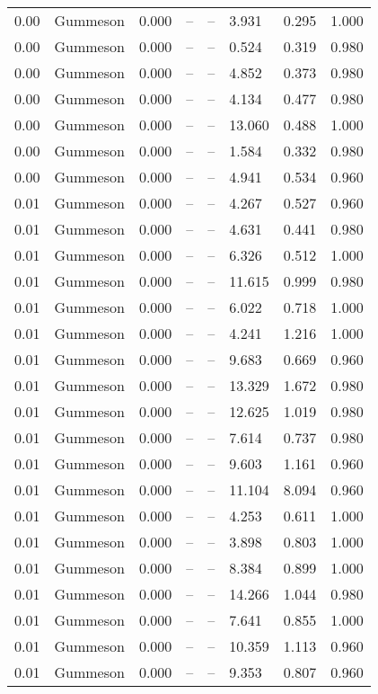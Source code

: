 \begin{table}[H]
\begin{tabular}{l c l l l}
0.00 & Gummeson & 0.000 & -- & -- & 3.931 & 0.295 & 1.000 \\
0.00 & Gummeson & 0.000 & -- & -- & 0.524 & 0.319 & 0.980 \\
0.00 & Gummeson & 0.000 & -- & -- & 4.852 & 0.373 & 0.980 \\
0.00 & Gummeson & 0.000 & -- & -- & 4.134 & 0.477 & 0.980 \\
0.00 & Gummeson & 0.000 & -- & -- & 13.060 & 0.488 & 1.000 \\
0.00 & Gummeson & 0.000 & -- & -- & 1.584 & 0.332 & 0.980 \\
0.00 & Gummeson & 0.000 & -- & -- & 4.941 & 0.534 & 0.960 \\
0.01 & Gummeson & 0.000 & -- & -- & 4.267 & 0.527 & 0.960 \\
0.01 & Gummeson & 0.000 & -- & -- & 4.631 & 0.441 & 0.980 \\
0.01 & Gummeson & 0.000 & -- & -- & 6.326 & 0.512 & 1.000 \\
0.01 & Gummeson & 0.000 & -- & -- & 11.615 & 0.999 & 0.980 \\
0.01 & Gummeson & 0.000 & -- & -- & 6.022 & 0.718 & 1.000 \\
0.01 & Gummeson & 0.000 & -- & -- & 4.241 & 1.216 & 1.000 \\
0.01 & Gummeson & 0.000 & -- & -- & 9.683 & 0.669 & 0.960 \\
0.01 & Gummeson & 0.000 & -- & -- & 13.329 & 1.672 & 0.980 \\
0.01 & Gummeson & 0.000 & -- & -- & 12.625 & 1.019 & 0.980 \\
0.01 & Gummeson & 0.000 & -- & -- & 7.614 & 0.737 & 0.980 \\
0.01 & Gummeson & 0.000 & -- & -- & 9.603 & 1.161 & 0.960 \\
0.01 & Gummeson & 0.000 & -- & -- & 11.104 & 8.094 & 0.960 \\
0.01 & Gummeson & 0.000 & -- & -- & 4.253 & 0.611 & 1.000 \\
0.01 & Gummeson & 0.000 & -- & -- & 3.898 & 0.803 & 1.000 \\
0.01 & Gummeson & 0.000 & -- & -- & 8.384 & 0.899 & 1.000 \\
0.01 & Gummeson & 0.000 & -- & -- & 14.266 & 1.044 & 0.980 \\
0.01 & Gummeson & 0.000 & -- & -- & 7.641 & 0.855 & 1.000 \\
0.01 & Gummeson & 0.000 & -- & -- & 10.359 & 1.113 & 0.960 \\
0.01 & Gummeson & 0.000 & -- & -- & 9.353 & 0.807 & 0.960 \\

\end{tabular}
\end{table}
